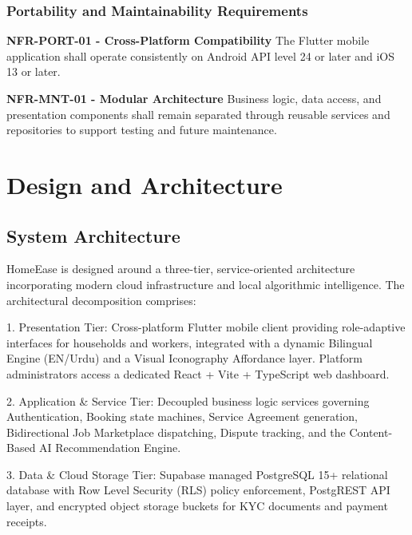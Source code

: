 \documentclass[12pt,a4paper]{article}
\newcommand{\urduword}{Urdu}
\newcommand{\urduword}{Urdu}
\begin{document}
\subsubsection{Portability and Maintainability Requirements}
\begin{list}{}{\setlength{\leftmargin}{1.5em}\setlength{\labelsep}{0.5em}\setlength{\topsep}{2pt}\setlength{\itemsep}{6pt}\setlength{\parsep}{0pt}}
\item[\textbullet] \textbf{NFR-PORT-01 - Cross-Platform Compatibility}\newline{}
The Flutter mobile application shall operate consistently on Android API level 24 or later and iOS 13 or later.

\item[\textbullet] \textbf{NFR-MNT-01 - Modular Architecture}\newline{}
Business logic, data access, and presentation components shall remain separated through reusable services and repositories to support testing and future maintenance.
\end{list}

\clearpage\section{Design and Architecture}
\subsection{System Architecture}
HomeEase is designed around a three-tier, service-oriented architecture incorporating modern cloud infrastructure and local algorithmic intelligence. The architectural decomposition comprises:

1. Presentation Tier: Cross-platform Flutter mobile client providing role-adaptive interfaces for households and workers, integrated with a dynamic Bilingual Engine (EN/\urduword) and a Visual Iconography Affordance layer. Platform administrators access a dedicated React + Vite + TypeScript web dashboard.

2. Application \& Service Tier: Decoupled business logic services governing Authentication, Booking state machines, Service Agreement generation, Bidirectional Job Marketplace dispatching, Dispute tracking, and the Content-Based AI Recommendation Engine.

3. Data \& Cloud Storage Tier: Supabase managed PostgreSQL 15+ relational database with Row Level Security (RLS) policy enforcement, PostgREST API layer, and encrypted object storage buckets for KYC documents and payment receipts.
\end{document}
